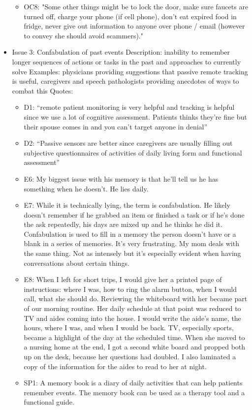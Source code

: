 \begin{itemize}
\begin{itemize}
    \item OC8: "Some other things might be to lock the door, make sure faucets are turned off, charge your phone (if cell phone), don’t eat expired food in fridge, never give out information to anyone over phone / email (however to convey she should avoid scammers)."
\end{itemize}


\item Issue 3: Confabulation of past events 
Description: inability to remember longer sequences of actions or tasks in the past and approaches to currently solve  
Examples: physicians providing suggestions that passive remote tracking is useful, caregivers and speech pathologists providing anecdotes of ways to combat this 
Quotes: 
\begin{itemize}
    \item D1:  “remote patient monitoring is very helpful and tracking is helpful since we use a lot of cognitive assessment. Patients thinks they’re fine but their spouse comes in and you can’t target anyone in denial”
    \item D2: “Passive sensors are better since caregivers are usually filling out subjective questionnaires of activities of daily living form and functional assessment”
    \item E6: My biggest issue with his memory is that he'll tell us he has something when he doesn't. He lies daily.
    \item E7: While it is technically lying, the term is confabulation. He likely doesn't remember if he grabbed an item or finished a task or if he's done the ask repeatedly, his days are mixed up and he thinks he did it. Confabulation is used to fill in a memory the person doesn't have or a blank in a series of memories. It's very frustrating. My mom deals with the same thing. Not as intensely but it's especially evident when having conversations about certain things.
    \item E8: When I left for short trips, I would give her a printed page of instructions: where I was, how to ring the alarm button, when I would call, what she should do. Reviewing the whiteboard with her became part of our morning routine. Her daily schedule at that point was reduced to TV and aides coming into the house. I would write the aide's name, the hours, where I was, and when I would be back. TV, especially sports, became a highlight of the day at the scheduled time. When she moved to a nursing home at the end, I got a second white board and propped both up on the desk, because her questions had doubled. I also laminated a copy of the information for the aides to read to her at night. 
    \item SP1: A memory book is a diary of daily activities that can help patients remember events. The memory book can be used as a therapy tool and a functional guide.
\end{itemize}
    
\end{itemize}
